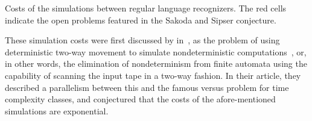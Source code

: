 \begin{table}
	\centering
	\caption[Costs of the simulations between regular language recognizers.]{Costs of the simulations between regular language recognizers.
		The red cells indicate the open problems featured in the Sakoda and Sipser conjecture.}
	\label{tab:sims-core-general-context}
\end{table}

These simulation costs were first discussed by \citeauthor{SakSip78} in~\citeyear{SakSip78}, as the problem of using deterministic two-way movement to simulate nondeterministic computations~\cite{SakSip78}, or, in other words, the elimination of nondeterminism from finite automata using the capability of scanning the input tape in a two-way fashion.
In their article, they described a parallelism between this and the famous \cP versus \cNP problem for time complexity classes, and conjectured that the costs of the afore-mentioned simulations are exponential.%

